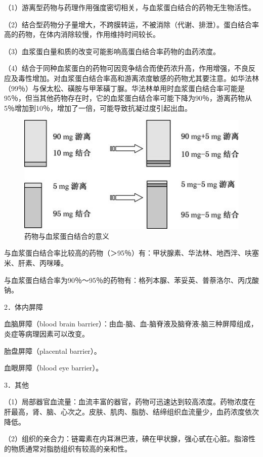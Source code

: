 （1）游离型药物与药理作用强度密切相关，与血浆蛋白结合的药物无生物活性。

（2）结合型药物分子量增大，不跨膜转运，不被消除（代谢、排泄）。蛋白结合率高的药物，在体内消除较慢，作用维持时间较长。

（3）血浆蛋白量和质的改变可能影响高蛋白结合率药物的血药浓度。

（4）结合于同种血浆蛋白的药物可因竞争结合而使药浓升高，作用增强，不良反应及毒性增加。对血浆蛋白结合率高和游离浓度敏感的药物尤其要注意。如华法林（99％）与保太松、磺胺与甲苯磺丁脲。华法林单用时血浆蛋白结合率可能是95％，但当其他药物存在时，它的血浆蛋白结合率可能下降为90％，游离药物从5％增加到10％，增加了一倍，可能导致抗凝过度引起出血。

\begin{figure}[!htbp]
 \centering
 \includegraphics{./images/Image00036.jpg}
 \captionsetup{justification=centering}
 \caption{药物与血浆蛋白结合的意义}
 \label{fig3-9}
  \end{figure} 

与血浆蛋白结合率比较高的药物（＞95％）有：甲状腺素、华法林、地西泮、呋塞米、肝素、丙咪嗪。

与血浆蛋白结合率为90％～95％的药物有：格列本脲、苯妥英、普萘洛尔、丙戊酸钠。

2．体内屏障

血脑屏障（blood brain
barrier）：由血-脑、血-脑脊液及脑脊液-脑三种屏障组成，炎症等病理因素可以改变。

胎盘屏障（placental barrier）。

血眼屏障（blood eye barrier）。

3．其他

（1）局部器官血流量：血流丰富的器官，药物可迅速达到较高浓度。药物浓度在肝最高，肾、脑、心次之。皮肤、肌肉、脂肪、结缔组织血流量少，血药浓度依次降低。

（2）组织的亲合力：链霉素在内耳淋巴液，碘在甲状腺，强心甙在心脏。脂溶性的物质通常对脂肪组织有较高的亲和性。

